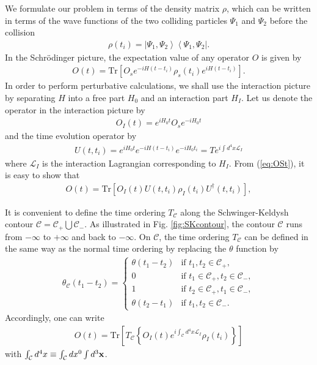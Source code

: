 \documentclass[onecolumn,showpacs,nobibnotes,nofootinbib,12pt,aps,prd,showpacs,notitlepage,nofootinbib,preprintnumbers,amsmath,amssymb]{article}
\newcommand{\Tr}{\mathrm{Tr}}
\begin{document}
We formulate our problem in terms of the density matrix $\rho$, which
can be written in terms of the wave functions of the two colliding
particles $\Psi_1$ and $\Psi_2$ before the collision
\begin{align}
\rho(t_i)=\left|\Psi_1,\Psi_2\right>\left<\Psi_1,\Psi_2\right|.
\end{align} 
In the Schr\"{o}dinger picture, the expectation value of any operator
$O$ is given by
\begin{align}
  O(t) = \Tr\left[O_s e^{-iH (t-t_i)}\rho_s (t_i) e^{i
      H(t-t_i)}\right].\label{eq:OSt}
\end{align}
In order to perform perturbative calculations, we shall use the
interaction picture by separating $H$ into a free part $H_0$ and an
interaction part $H_I$. Let us denote the operator in the interaction
picture by
\begin{align}
O_I(t)=e^{iH_0 t}O_s e^{-iH_0 t}
\end{align}
and the time evolution operator by
\begin{align}
U(t,t_i)=e^{iH_0 t}e^{-iH(t-t_i)} e^{-iH_0 t_i}=Te^{i\int d^4x \mathcal{L}_{I}}
\end{align}
where $\mathcal{L}_I$ is the interaction Lagrangian corresponding to
$H_I$. From (\ref{eq:OSt}), it is easy to show that
\begin{align}
O(t)=\Tr\left[O_I(t)U(t,t_i)\rho_I(t_i)U^\dagger(t,t_i)\right],\label{eq:Ot}
\end{align}

It is convenient to define the time ordering $T_{\mathcal{C}}$ along
the Schwinger-Keldysh contour $\mathcal{C}=\mathcal{C}_+\bigcup
\mathcal{C}_-$. As illustrated in Fig. \ref{fig:SKcontour}, the
contour $\mathcal{C}$ runs from $-\infty$ to $+\infty$ and back to
$-\infty$. On $\mathcal{C}$, the time ordering $T_{\mathcal{C}}$ can
be defined in the same way as the normal time ordering by replacing
the $\theta$ function by \cite{Niemi:1983nf}
\begin{align}
\theta_{\mathcal{C}}(t_1-t_2)=\left\{
\begin{array}{ll}
\theta(t_1-t_2)&\text{if }t_1,t_2 \in \mathcal{C}_+,\\
0&\text{if }t_1 \in \mathcal{C}_+, t_2 \in \mathcal{C}_-,\\
1&\text{if }t_2 \in \mathcal{C}_+, t_1 \in \mathcal{C}_-,\\
\theta(t_2-t_1)&\text{if }t_1,t_2 \in \mathcal{C}_-.
\end{array}
\right.
\end{align}
Accordingly, one can write
\begin{align}
  O(t) = \Tr\left[T_{\mathcal{C}} \left\{ O_I(t)
      e^{i\int_{\mathcal{C}} d^4 x \mathcal{L}_I} \rho_I(t_i) \right\}
  \right]\label{eq:OtC}
\end{align}
with $\int_{\mathcal{C}} d^4 x\equiv\int_{\mathcal{C}} d x^0\int d^3{\bf x}$. 
\end{document}
